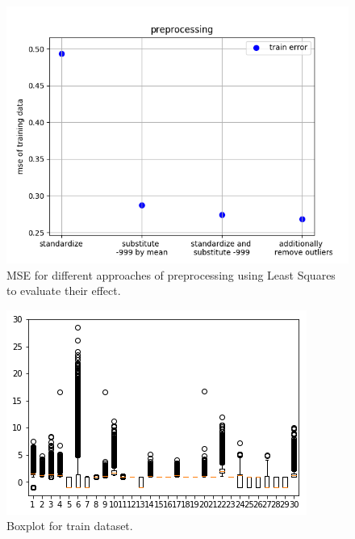\documentclass[10pt,conference,compsocconf]{IEEEtran}
\begin{document}
\begin{figure}[htbp]
	\centering
	\includegraphics[width=\columnwidth]{preprocessing.png}
	\caption{MSE for different approaches of preprocessing using Least Squares to evaluate their effect.}
	\vspace{-3mm}
	\label{fig:prepro}
\end{figure}


\begin{figure}
	\centering
	\includegraphics[width=\columnwidth]{trainBoxPlot.png}
	\caption{Boxplot for train dataset. }
	\vspace{-3mm}
	\label{fig:boxplottrainset}
\end{figure}
\end{document}
